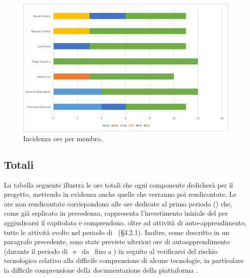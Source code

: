 \begin{figure}[H]
	\centering 
	\includegraphics[scale=0.7]{Immagini/GraficiPianoLavoro/VV.png}
	\caption{Incidenza ore per membro, \VV}
\end{figure}

\newpage
\subsection{Totali}
La tabella seguente illustra le ore totali che ogni componente dedicherà per il progetto, mettendo in evidenza anche quelle che verranno poi rendicontate. Le ore non rendicontate corrispondono alle ore dedicate al primo periodo (\ARM) che, come già esplicato in precedenza, rappresenta l'investimento iniziale del  per aggiudicarsi il capitolato e comprendono, oltre ad attività di auto-apprendimento, tutte le attività svolte nel periodo di \ARM\ (§3.2.1). Inoltre, come descritto in un paragrafo precedente, sono state previste ulteriori ore di autoapprendimento (durante il periodo di \PD\ e \COD\ da \RP\ fino a \RQ) in seguito al verificarsi del rischio tecnologico relativo alla difficile comprensione di alcune tecnologie, in particolare la difficile comprensione della documentazione della piattaforma .

